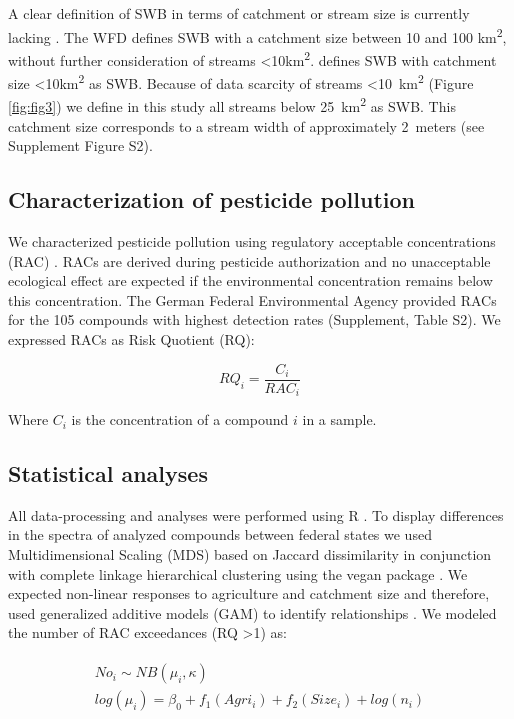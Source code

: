 \documentclass[journal=esthag,manuscript=article]{achemso}
\begin{document}
A clear definition of SWB in terms of catchment or stream size is currently lacking \citep{lorenz_specifics_2016}. 
The WFD defines SWB with a catchment size between 10 and 100 km\textsuperscript{2}, without further consideration of streams \textless 10km\textsuperscript{2}. 
\citet{lorenz_specifics_2016} defines SWB with catchment size \textless 10km\textsuperscript{2} as SWB.
Because of data scarcity of streams \textless 10~km\textsuperscript{2} (Figure \ref{fig:fig3}) we define in this study all streams below 25~km\textsuperscript{2} as SWB. This catchment size corresponds to a stream width of approximately 2~meters (see Supplement Figure S2).


\subsection{Characterization of pesticide pollution}
We characterized pesticide pollution using regulatory acceptable concentrations (RAC) \citep{brock_linking_2010}.
RACs are derived during pesticide authorization and no unacceptable ecological effect are expected if the environmental concentration remains below this concentration.
The German Federal Environmental Agency provided RACs for the 105 compounds with highest detection rates (Supplement, Table S2). 
We expressed RACs as Risk Quotient (RQ):

\begin{equation}
RQ_i = \frac{C_i}{RAC_i}
\end{equation}

Where $C_i$ is the concentration of a compound $i$ in a sample.


\subsection{Statistical analyses}
All data-processing and analyses were performed using R \citep{r_core_team_r:_2016}.
To display differences in the spectra of analyzed compounds between federal states we used Multidimensional Scaling (MDS) based on Jaccard dissimilarity in conjunction with complete linkage hierarchical clustering using the vegan package \citep{oksanen_vegan:_2016}.
We expected non-linear responses to agriculture and catchment size and therefore, used generalized additive models (GAM) to identify relationships \citep{fewster_analysis_2000}.
We modeled the number of RAC exceedances (RQ \textgreater 1) as:

\begin{align}
\begin{split}
  No_i \sim NB(\mu_i, \kappa) \\
  log(\mu_i)= \beta_0 + f_1(Agri_i) + f_2(Size_i) + log(n_i) \\
\end{split}
\end{align}
\end{document}

